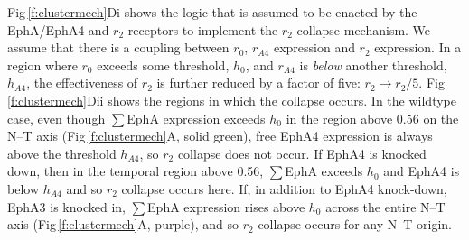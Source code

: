 \documentclass[9pt,lineno,draft]{elife}
\begin{document}
Fig\,\ref{f:clustermech}Di shows the logic that is assumed to be enacted by the EphA/EphA4 and $r_2$ receptors to implement the $r_2$ collapse mechanism. We assume that there is a coupling between $r_0$, $r_{A4}$ expression and $r_2$ expression. In a region where $r_0$ exceeds some threshold, $h_0$, and $r_{A4}$ is \emph{below} another threshold, $h_{A4}$, the effectiveness of $r_2$ is further reduced by a factor of five: $r_2 \rightarrow r_2/5$.
Fig\,\ref{f:clustermech}Dii shows the regions in which the collapse occurs.
In the wildtype case, even though $\sum$EphA expression exceeds $h_0$ in the region above 0.56 on the N--T axis (Fig\,\ref{f:clustermech}A, solid green), free EphA4 expression is always above the threshold $h_{A4}$, so $r_2$ collapse does not occur.
If EphA4 is knocked down, then in the temporal region above 0.56, $\sum$EphA exceeds $h_0$ and EphA4 is below $h_{A4}$ and so $r_2$ collapse occurs here.
If, in addition to EphA4 knock-down, EphA3 is knocked in, $\sum$EphA expression rises above $h_0$ across the entire N--T axis (Fig\,\ref{f:clustermech}A, purple), and so $r_2$ collapse occurs for any N--T origin.
\end{document}
